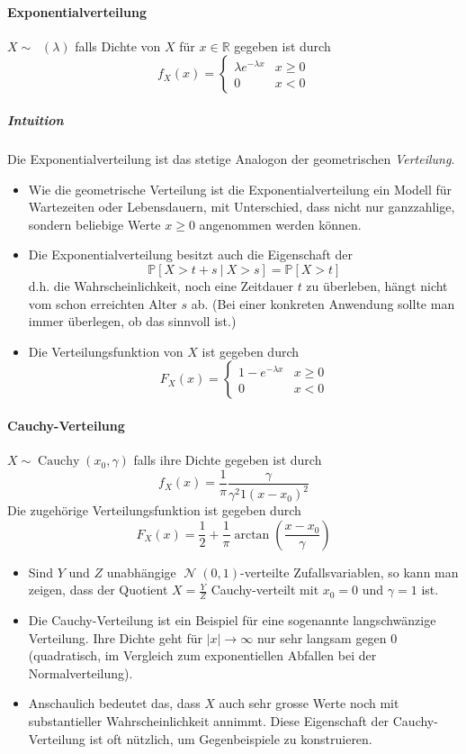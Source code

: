 \documentclass[a4paper,10pt]{article}
\def\R{\mathbb{R}}
\def\P{\mathbb{P}}
\DeclareMathOperator{\Exponential}{\mathrm{}}
\DeclareMathOperator{\Cauchy}{\mathrm{Cauchy}}
\DeclareMathOperator{\Normal}{\mathcal{N}}
\begin{document}
\paragraph{Exponentialverteilung} \( X \sim \Exponential(\lambda) \) falls Dichte von \( X \) für \( x \in \R \) gegeben ist durch
\[ f_X(x) = \begin{cases}
    \lambda e^{-\lambda x} & x \geq 0 \\
    0 & x < 0
\end{cases} \]

\subparagraph{Intuition} Die Exponentialverteilung ist das stetige Analogon der geometrischen \emph{Verteilung}.
\begin{itemize}
    \item Wie die geometrische Verteilung ist die Exponentialverteilung ein Modell für Wartezeiten oder Lebensdauern, mit Unterschied, dass nicht nur ganzzahlige, sondern beliebige Werte \( x \geq 0 \) angenommen werden können.
    \item Die Exponentialverteilung besitzt auch die Eigenschaft der 
    \[ \P[X > t + s \: | \: X > s] = \P[X > t] \]
    d.h. die Wahrscheinlichkeit, noch eine Zeitdauer \( t \) zu überleben, hängt nicht vom schon erreichten Alter \( s \) ab. (Bei einer konkreten Anwendung sollte man immer überlegen, ob das sinnvoll ist.)
\end{itemize}

\begin{itemize}
    \item Die Verteilungsfunktion von \( X \) ist gegeben durch
    \[ F_X(x) = \begin{cases}
        1 - e^{-\lambda x} & x \geq 0 \\
        0 & x < 0
    \end{cases} \]
\end{itemize}

\paragraph{Cauchy-Verteilung} \( X \sim \Cauchy(x_0, \gamma) \) falls ihre Dichte gegeben ist durch
\[ f_X(x) = \frac{1}{\pi} \frac{\gamma}{\gamma^2 1 (x - x_0)^2} \]
Die zugehörige Verteilungsfunktion ist gegeben durch
\[ F_X(x) = \frac{1}{2} + \frac{1}{\pi} \arctan \left( \frac{x - x_0}{\gamma} \right) \]
\begin{itemize}
    \item Sind \( Y \) und \( Z \) unabhängige \( \Normal(0, 1) \)-verteilte Zufallsvariablen, so kann man zeigen, dass der Quotient \( X = \frac{Y}{Z} \) Cauchy-verteilt mit \( x_0 = 0 \) und \( \gamma = 1 \) ist.
    \item Die Cauchy-Verteilung ist ein Beispiel für eine sogenannte langschwänzige Verteilung. Ihre Dichte geht für \( |x| \to \infty \) nur sehr langsam gegen \( 0 \) (quadratisch, im Vergleich zum exponentiellen Abfallen bei der Normalverteilung).
    \item Anschaulich bedeutet das, dass \( X \) auch sehr grosse Werte noch mit substantieller Wahrscheinlichkeit annimmt. Diese Eigenschaft der Cauchy-Verteilung ist oft nützlich, um Gegenbeispiele zu konstruieren.
\end{itemize}
\end{document}
